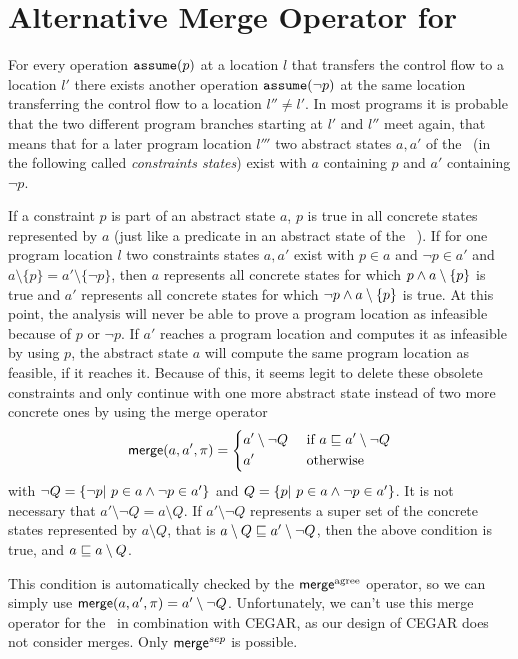 \section{Alternative Merge Operator for \ConstraintsCPA}
\label{sec:newMerge}
For every operation $\texttt{assume}(p)$ at a location $l$ that transfers the control flow to a location $l'$ there exists another operation $\texttt{assume}(\neg p)$ at the same location transferring the control flow to a location $l'' \neq l'$.
In most programs it is probable that the two different program branches starting at $l'$ and $l''$ meet again, that means that for a later program location $l'''$ two abstract states $a, a'$ of the \constraintsCPA\ (in the following  called \emph{constraints states}) exist with $a$ containing $p$ and $a'$ containing $\neg p$.

If a constraint $p$ is part of an abstract state $a$, $p$ is true in all concrete states represented by $a$ (just like a predicate in an abstract state of the \predicateCPA\ \cite{Beyer2008}).
If for one program location $l$ two constraints states $a, a'$ exist with $p \in a$ and $\neg p \in a'$ and $a \setminus \{ p \} = a' \setminus \{ \neg p \}$,
then $a$ represents all concrete states for which $p \wedge a \setminus \{ p \}$ is true and $a'$ represents all concrete states for which $\neg p \wedge a \setminus \{ p \}$ is true.
At this point, the analysis will never be able to prove a program location as infeasible because of $p$ or $\neg p$.
If $a'$ reaches a program location and computes it as infeasible by using $p$, the abstract state $a$ will compute the same program location as feasible, if it reaches it.
Because of this, it seems legit to delete these obsolete constraints and only continue with one more abstract state instead of two more concrete ones by using the merge operator
\[ \operatorname{\operatorname{\mathsf{merge}}} (a, a', \pi) = \begin{dcases}
a' \setminus \neg Q & \text{ if } a \sqsubseteq a' \setminus \neg Q \\
a' & \text{ otherwise}
\end{dcases} \]
with $\neg Q = \{\neg p |\ p \in a \wedge \neg p \in a' \}$ and $Q = \{ p |\ p \in a \wedge \neg p \in a' \}$.
It is not necessary that $a' \setminus \neg Q = a \setminus Q$.
If $a' \setminus \neg Q$ represents a super set of the concrete states represented by $a \setminus Q$, that is $a \setminus Q \sqsubseteq a' \setminus \neg Q$, then the above condition is true, and $a \sqsubseteq a \setminus Q$.

This condition is automatically checked by the $\operatorname{{\operatorname{\operatorname{\mathsf{merge}}}^{agree}}}$ operator, so we can simply use $\operatorname{\operatorname{\mathsf{merge}}}(a, a', \pi) = a' \setminus \neg Q$.
Unfortunately, we can't use this merge operator for the \constraintsCPA\ in combination with CEGAR, as our design of CEGAR does not consider merges.
Only $\operatorname{\operatorname{\mathsf{merge}}}^{sep}$ is possible.
